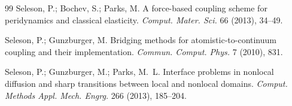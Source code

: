 \documentclass[reqno]{amsart}
\numberwithin{equation}{section}
\begin{document}
\begin{thebibliography}{99}
Seleson, P.; Bochev, S.; Parks, M.
{A force-based coupling scheme for peridynamics and classical elasticity}.
\emph{Comput. Mater. Sci.} 66 (2013), 34--49.

Seleson, P.; Gunzburger, M.
{Bridging methods for atomistic-to-continuum coupling and their implementation}.
\emph{Commun. Comput. Phys.} 7 (2010), 831.

Seleson, P.; Gunzburger, M.; Parks, M.~L.
{Interface problems in nonlocal diffusion and sharp transitions between local and nonlocal domains}.
\emph{Comput. Methods Appl. Mech. Engrg.} 266 (2013), 185--204.


\end{thebibliography} 
\end{document}

